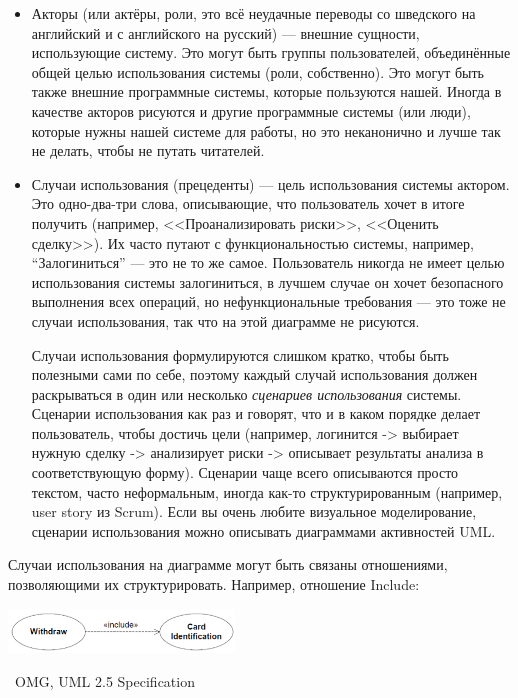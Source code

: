 \documentclass[a5paper]{article}
\newcommand{\attribution}[1] {
    \vspace{-4mm}\begin{flushright}\begin{scriptsize}%
    {\textcopyright\, #1}\end{scriptsize}\end{flushright}
}
\begin{document}
\begin{itemize}
    \item Акторы (или актёры, роли, это всё неудачные переводы со шведского на английский и с английского на русский) --- внешние сущности, использующие систему. Это могут быть группы пользователей, объединённые общей целью использования системы (роли, собственно). Это могут быть также внешние программные системы, которые пользуются нашей. Иногда в качестве акторов рисуются и другие программные системы (или люди), которые нужны нашей системе для работы, но это неканонично и лучше так не делать, чтобы не путать читателей.
    \item Случаи использования (прецеденты)  --- цель использования системы актором. Это одно-два-три слова, описывающие, что пользователь хочет в итоге получить (например, <<Проанализировать риски>>, <<Оценить сделку>>). Их часто путают с функциональностью системы, например, ``Залогиниться'' --- это не то же самое. Пользователь никогда не имеет целью использования системы залогиниться, в лучшем случае он хочет безопасного выполнения всех операций, но нефункциональные требования --- это тоже не случаи использования, так что на этой диаграмме не рисуются.

    Случаи использования формулируются слишком кратко, чтобы быть полезными сами по себе, поэтому каждый случай использования должен раскрываться в один или несколько \textit{сценариев использования} системы. Сценарии использования как раз и говорят, что и в каком порядке делает пользователь, чтобы достичь цели (например, логинится -> выбирает нужную сделку -> анализирует риски -> описывает результаты анализа в соответствующую форму). Сценарии чаще всего описываются просто текстом, часто неформальным, иногда как-то структурированным (например, user story из Scrum). Если вы очень любите визуальное моделирование, сценарии использования можно описывать диаграммами активностей UML.
\end{itemize}

Случаи использования на диаграмме могут быть связаны отношениями, позволяющими их структурировать. Например, отношение Include:

\begin{center}
    \includegraphics[width=0.45\textwidth]{useCaseInclude.png}
    \attribution{OMG, UML 2.5 Specification}
\end{center}
\end{document}
